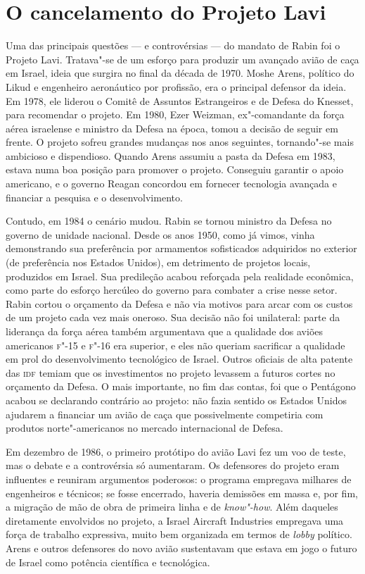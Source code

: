 \section{O cancelamento do Projeto Lavi}

Uma das principais questões --- e controvérsias --- do mandato de Rabin
foi o Projeto Lavi. Tratava"-se de um esforço para produzir um avançado
avião de caça em Israel, ideia que surgira no final da década de 1970.
Moshe Arens, político do Likud e engenheiro aeronáutico por profissão,
era o principal defensor da ideia. Em 1978, ele liderou o Comitê de
Assuntos Estrangeiros e de Defesa do Knesset, para recomendar o projeto.
Em 1980, Ezer Weizman, ex"-comandante da força aérea israelense e
ministro da Defesa na época, tomou a decisão de seguir em frente. O
projeto sofreu grandes mudanças nos anos seguintes, tornando"-se mais
ambicioso e dispendioso. Quando Arens assumiu a pasta da Defesa em 1983,
estava numa boa posição para promover o projeto. Conseguiu garantir o
apoio americano, e o governo Reagan concordou em fornecer tecnologia
avançada e financiar a pesquisa e o desenvolvimento.

Contudo, em 1984 o cenário mudou. Rabin se tornou ministro da Defesa no
governo de unidade nacional. Desde os anos 1950, como já vimos, vinha
demonstrando sua preferência por armamentos sofisticados adquiridos no
exterior (de preferência nos Estados Unidos), em detrimento de projetos
locais, produzidos em Israel. Sua predileção acabou reforçada pela
realidade econômica, como parte do esforço hercúleo do governo para
combater a crise nesse setor. Rabin cortou o orçamento da Defesa e não
via motivos para arcar com os custos de um projeto cada vez mais
oneroso. Sua decisão não foi unilateral: parte da liderança da força
aérea também argumentava que a qualidade dos aviões americanos \textsc{f}"-15 e
\textsc{f}"-16 era superior, e eles não queriam sacrificar a qualidade em prol do
desenvolvimento tecnológico de Israel. Outros oficiais de alta patente
das \textsc{idf} temiam que os investimentos no projeto levassem a futuros cortes
no orçamento da Defesa. O mais importante, no fim das contas, foi que o
Pentágono acabou se declarando contrário ao projeto: não fazia sentido
os Estados Unidos ajudarem a financiar um avião de caça que
possivelmente competiria com produtos norte"-americanos no mercado
internacional de Defesa.

Em dezembro de 1986, o primeiro protótipo do avião Lavi fez um voo de
teste, mas o debate e a controvérsia só aumentaram. Os defensores do
projeto eram influentes e reuniram argumentos poderosos: o programa
empregava milhares de engenheiros e técnicos; se fosse encerrado,
haveria demissões em massa e, por fim, a migração de mão de obra de
primeira linha e de \emph{know"-how}. Além daqueles diretamente envolvidos no
projeto, a Israel Aircraft Industries empregava uma força de trabalho
expressiva, muito bem organizada em termos de \emph{lobby} político. Arens e
outros defensores do novo avião sustentavam que estava em jogo o futuro
de Israel como potência científica e tecnológica.

